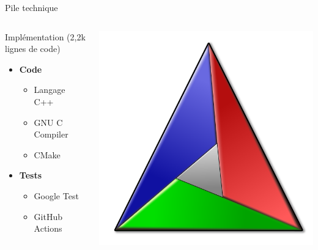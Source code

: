 \begin{frame}{Pile technique}
\begin{columns}
    \begin{column}{0.5\textwidth}
        Implémentation (2,2k lignes de code)
        \begin{itemize}
            \item \textbf{Code}
            \begin{itemize}
                \item Langage C++
                \item GNU C Compiler
                \item CMake
            \end{itemize}
            \item \textbf{Tests}
            \begin{itemize}
                \item Google Test
                \item GitHub Actions
            \end{itemize}
        \end{itemize}
    \end{column}
    \begin{column}{0.5\textwidth}
        \begin{center}
            
            

            \includegraphics[scale=0.1]{./images/cmake-logo.png}
        \end{center}
    \end{column}
\end{columns}
\end{frame}

